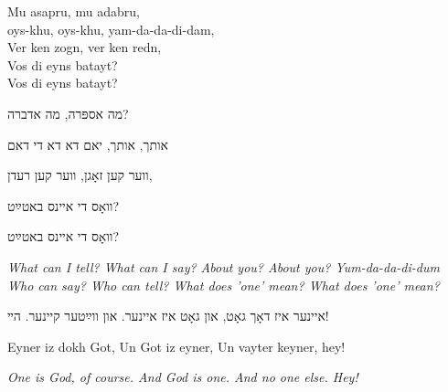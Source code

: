\begin{minipage}{0.52\linewidth}
\begin{english}
Mu asapru, mu adabru, \\
oys-khu, oys-khu, yam-da-da-di-dam, \\
Ver ken zogn, ver ken redn, \\
Vos di eyns batayt? \\
Vos di eyns batayt?
\end{english}
\end{minipage} \hspace{0.02\linewidth}
\begin{minipage}{0.44\linewidth}
מה אספּרה, מה אדברה?

אותך, אותך, יאם דא דא די דאם

ווער קען זאָגן, ווער קען רעדן, 

וואָס די איינס באטײַט?

וואָס די איינס באטײַט?
\end{minipage}

\vspace{1em}

\begin{english}
{\itshape
What can I tell? 
What can I say?
About you? About you?
Yum-da-da-di-dum \\
Who can say? 
Who can tell?
What does 'one' mean?
What does 'one' mean?}
\end{english}

\begin{center}
איינער איז דאָך גאָט,
און גאָט איז איינער. 
און ווײַטער קיינער. הײ!

\begin{english}
Eyner iz dokh Got,
Un Got iz eyner,
Un vayter keyner, hey!

{\itshape One is God, of course. 
And God is one. 
And no one else. Hey!}
\end{english}
\end{center}

